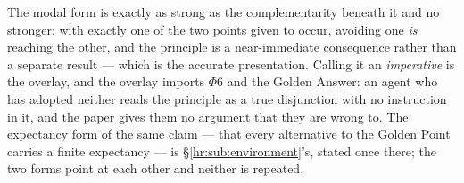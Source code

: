 \documentclass[11pt]{article}
\numberwithin{equation}{section}
\theoremstyle{plain}
\theoremstyle{definition}
\theoremstyle{remark}
\begin{document}
The modal form is exactly as strong as the complementarity beneath it and no stronger: with exactly one of the two points given to occur, avoiding one \emph{is} reaching the other, and the principle is a near-immediate consequence rather than a separate result --- which is the accurate presentation. Calling it an \emph{imperative} is the overlay, and the overlay imports $\Phi6$ and the Golden Answer: an agent who has adopted neither reads the principle as a true disjunction with no instruction in it, and the paper gives them no argument that they are wrong to. The expectancy form of the same claim --- that every alternative to the Golden Point carries a finite expectancy --- is \S\ref{hr:sub:environment}'s, stated once there; the two forms point at each other and neither is repeated.

\end{document}
